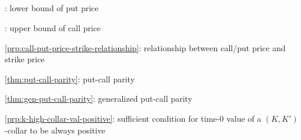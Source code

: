 \subsection*{}
\item {}: lower bound of put price
\item {}: upper bound of call price
\item \cref{prp:call-put-price-strike-relationship}: relationship between call/put price and strike price
\item \cref{thm:put-call-parity}: put-call parity
\item \cref{thm:gen-put-call-parity}: generalized put-call parity
\item \cref{prp:k-high-collar-val-positive}: sufficient condition for time-0 value of a \((K,K')\)-collar to be always positive

